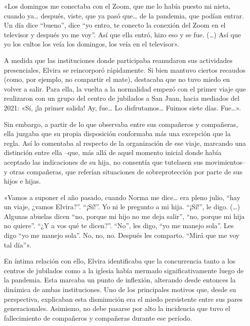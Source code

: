 \begin{refsection}
\begin{gbcita}
«Los domingos me conectaba con el Zoom, que me lo había puesto mi nieta, cuando ya… después, viste, que ya pasó que… de la pandemia, que podían entrar. Un día dice “bueno”, dice “yo entro, te conecto la conexión del Zoom en el televisor y después yo me voy”. Así que ella entró, hizo eso y se fue. (…) Así que yo los cultos los veía los domingos, los veía en el televisor».

\end{gbcita}

A medida que las instituciones donde participaba reanudaron sus actividades presenciales, Elvira se reincorporó rápidamente. Si bien mantuvo ciertos recaudos (como, por ejemplo, no compartir el mate), destacaba que no tuvo miedo en volver a salir. Para ella, la vuelta a la normalidad empezó con el primer viaje que realizaron con un grupo del centro de jubilados a San Juan, hacia mediados del 2021: «Sí, ¡la primer salida! Ay, fue… Lo disfrutamos… Fuimos siete días. Fue…».

Sin embargo, a partir de lo que observaba entre sus compañeros y compañeras, ella juzgaba que su propia disposición conformaba más una excepción que la regla. Así lo comentaba al respecto de la organización de ese viaje, marcando una distinción entre ella –que, más allá de aquel momento inicial donde había aceptado las indicaciones de su hija, no consentía que tutelasen sus movimientos– y otras compañeras, que referían situaciones de sobreprotección por parte de sus hijos e hijas.


\begin{gbcita}
«Vamos a suponer el año pasado, cuando Norma me dice… era pleno julio, “hay un viaje, ¿vamos Elvira?”. “¡Sí!”. Yo ni le pregunto a mi hija. “¡Sí!”, le digo. (…) Algunas abuelas dicen “no, porque mi hijo no me deja salir”, “no, porque mi hija no quiere”. “¿Y a vos qué te dicen?”. “No”, les digo, “yo me manejo sola”. Les digo “yo me manejo sola”. No, no, no. Después les comparto. “Mirá que me voy tal día”».

\end{gbcita}

En íntima relación con ello, Elvira identificaba que la concurrencia tanto a los centros de jubilados como a la iglesia había mermado significativamente luego de la pandemia. Esta marcaba un punto de inflexión, alterando desde entonces la dinámica de ambas instituciones. Uno de los principales motivos que, desde su perspectiva, explicaban esta disminución era el miedo persistente entre sus pares generacionales. Asimismo, no debe pasarse por alto la incidencia que tuvo el fallecimiento de compañeros y compañeras durante ese período.



\end{refsection}
